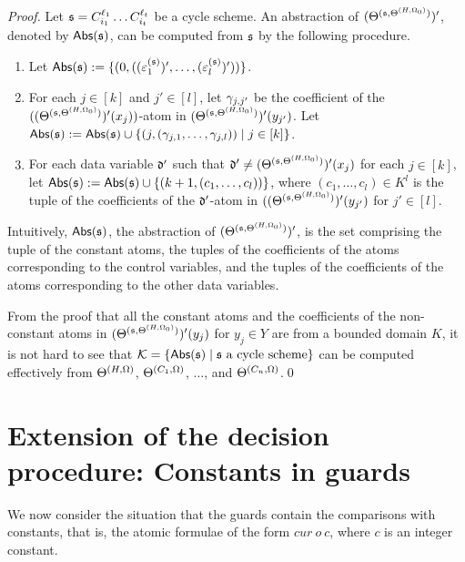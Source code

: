 \begin{appendix}
\begin{proof}
Let ${\mathfrak{s} }=C^{\ell_1}_{i_1} \dots C^{\ell_t}_{i_t}$ be a cycle scheme. An abstraction of $(\Theta^{({\mathfrak{s} },\Theta^{(H,\Omega_0)})})'$, denoted by $\mathsf{Abs}({\mathfrak{s} })$, can be computed from ${\mathfrak{s} }$ by the following procedure.
\begin{enumerate}
\item Let $\mathsf{Abs}({\mathfrak{s} }):=\{(0, ( (\varepsilon^{({\mathfrak{s} })}_{1})',\dots, (\varepsilon^{({\mathfrak{s} })}_l)'))\}$.
%
\item For each $j \in [k]$ and $j' \in [l]$, let $\gamma_{j, j'}$ be the coefficient of the $((\Theta^{({\mathfrak{s} },\Theta^{(H,\Omega_0)})})'(x_j))$-atom in $(\Theta^{({\mathfrak{s} },\Theta^{(H,\Omega_0)})})'(y_{j'})$. Let $\mathsf{Abs}({\mathfrak{s} }): = \mathsf{Abs}({\mathfrak{s} }) \cup \{(j, (\gamma_{j,1},\dots, \gamma_{j,l})) \mid j \in [k]\}$.
%
\item For each data variable $\mathfrak{d}'$ such that $\mathfrak{d}' \neq (\Theta^{({\mathfrak{s} },\Theta^{(H,\Omega_0)})})'(x_j)$ for each $j \in [k]$, let $\mathsf{Abs}({\mathfrak{s} }):=\mathsf{Abs}({\mathfrak{s} }) \cup \{(k+1, (c_1,\dots,c_l))\}$, where $(c_1,\dots,c_l) \in K^l$ is the tuple of the coefficients of the $\mathfrak{d}'$-atom in $((\Theta^{({\mathfrak{s} },\Theta^{(H,\Omega_0)})})'(y_{j'})$ for $j' \in [l]$. 
\end{enumerate}
Intuitively, $\mathsf{Abs}({\mathfrak{s} })$, the abstraction of  $(\Theta^{({\mathfrak{s} },\Theta^{(H,\Omega_0)})})'$,  is the set comprising the tuple of the constant atoms, the tuples of the coefficients of the atoms corresponding to the control variables, and the tuples of the coefficients of the atoms corresponding to the other data variables.

From the proof that all the constant atoms and the coefficients of the non-constant atoms in $(\Theta^{({\mathfrak{s} },\Theta^{(H,\Omega_0)})})'(y_j)$ for $y_j \in Y$ are from a bounded domain $K$, it is not hard to see that ${\mathcal{K}} = \{\mathsf{Abs}({\mathfrak{s} }) \mid {\mathfrak{s} } \mbox{ a cycle scheme}\}$ can be computed effectively from $\Theta^{(H,\Omega)}$, $\Theta^{(C_1,\Omega)}$, $\dots$, and $\Theta^{(C_n,\Omega)}$.\qed
\end{proof}


\section{Extension of the decision procedure: Constants in guards}

We now consider the situation that the guards contain the comparisons with constants, that is, the atomic formulae of the form $cur\ o\ c$, where $c$ is an integer constant. 


\end{appendix}
